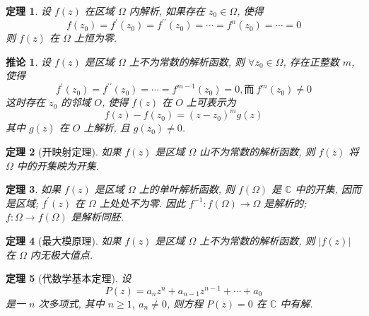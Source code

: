 \documentclass[12pt,a4paper]{article}
\newtheorem{thm}{定理}[section]  %
\newtheorem{corollary}{推论}[section] %
\begin{document}
\begin{thm}
    设 $f(z)$ 在区域 $\Omega$ 内解析, 如果存在 $z_0 \in \Omega$, 使得
    \[f(z_0) = f^{\prime}(z_0) = f^{\prime \prime} (z_0) = \cdots = f^{n}(z_0) = \cdots = 0\]
    则 $f(z)$ 在 $\Omega$ 上恒为零.
\end{thm}

\begin{corollary}
    设 $f(z)$ 是区域 $\Omega$ 上不为常数的解析函数, 则 $\forall z_0 \in \Omega$, 存在正整数 $m$, 使得
    \[f^{\prime}(z_0) = f^{\prime \prime}(z_0) = \cdots = f^{m-1}(z_0) = 0, \text{而}\  f^{m}(z_0) \neq 0\]
    这时存在 $z_0$ 的邻域 $O$, 使得 $f(z)$ 在 $O$ 上可表示为
    \[f(z) - f(z_0) = (z - z_0)^{m} g(z)\] 其中 $g(z)$ 在 $O$ 上解析, 且 $g(z_0) \neq 0$.
\end{corollary}

\begin{thm}[开映射定理]
    如果 $f(z)$ 是区域 $\Omega$ 山不为常数的解析函数, 则 $f(z)$ 将 $\Omega$ 中的开集映为开集.
\end{thm}

\begin{thm}
    如果 $f(z)$ 是区域 $\Omega$ 上的单叶解析函数, 则 $f(\Omega)$ 是 $\mathbb{C}$ 中的开集, 因而是区域;
    $f^{\prime}(z)$ 在 $\Omega$ 上处处不为零. 因此 $f^{-1}: f(\Omega) \to \Omega$ 是解析的; $f: \Omega \to f(\Omega)$ 是解析同胚.
\end{thm}

\begin{thm}[最大模原理]
    如果 $f(z)$ 是区域 $\Omega$ 上不为常数的解析函数, 则 $|f(z)|$ 在 $\Omega$ 内无极大值点.
\end{thm}

\begin{thm}[代数学基本定理]
    设 \[P(z) = a_n z^n + a_{n-1} z^{n-1} + \cdots + a_0\]
    是一 $n$ 次多项式, 其中 $n \geq 1$, $a_n \neq 0$, 则方程 $P(z) = 0$ 在 $\mathbb{C}$ 中有解.
\end{thm}
\end{document}
